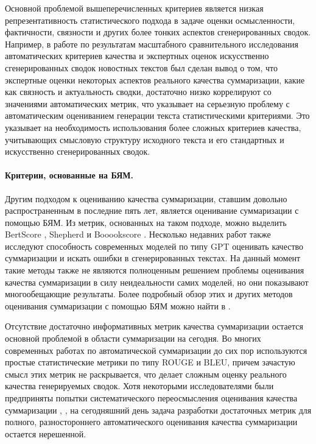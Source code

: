 \documentclass[12pt]{article}
\begin{document}
Основной проблемой вышеперечисленных критериев является низкая репрезентативность статистического подхода в задаче оценки осмысленности, фактичности, связности и других более тонких аспектов сгенерированных сводок. Например, в работе \cite{fabbri2021summeval} по результатам масштабного сравнительного исследования автоматических критериев качества и экспертных оценок искусственно сгенерированных сводок новостных текстов был сделан вывод о том, что экспертные оценки некоторых аспектов реального качества суммаризации, какие как связность и актуальность сводки, достаточно низко коррелируют со значениями автоматических метрик, что указывает на серьезную проблему с автоматическим оцениванием генерации текста статистическими критериями. Это указывает на необходимость использования более сложных критериев качества, учитывающих смысловую структуру исходного текста и его стандартных и искусственно сгенерированных сводок.

\paragraph{Критерии, основанные на БЯМ.}Другим подходом к оцениванию качества суммаризации, ставшим довольно распространенным в последние пять лет, является оценивание суммаризации с помощью БЯМ. Из метрик, основанных на таком подходе, можно выделить BertScore \cite{zhang2019bertscore}, Shepherd \cite{wang2023shepherd} и Booookscore \cite{chang2023booookscore}. Несколько недавних работ также исследуют способность современных моделей по типу GPT оценивать качество суммаризации и искать ошибки в сгенерированных текстах. На данный момент такие методы также не являются полноценным решением проблемы оценивания качества суммаризации в силу неидеальности самих моделей, но они показывают многообещающие результаты. Более подробный обзор этих и других методов оценивания суммаризации с помощью БЯМ можно найти в \cite{jin2024comprehensive}. 

Отсутствие достаточно информативных метрик качества суммаризации остается основной проблемой в области суммаризации на сегодня. Во многих современных работах по автоматической суммаризации до сих пор используются простые статистические метрики по типу ROUGE и BLEU, причем зачастую смысл этих метрик не раскрывается, что делает сложным оценку реального качества генерируемых сводок. Хотя некоторыми исследователями были предприняты попытки систематического переосмысления оценивания качества суммаризации \cite{fabbri2021summeval}, \cite{zhang2024benchmarking}, на сегодняшний день задача разработки достаточных метрик для полного, разностороннего автоматического оценивания качества суммаризации остается нерешенной.
\end{document}
